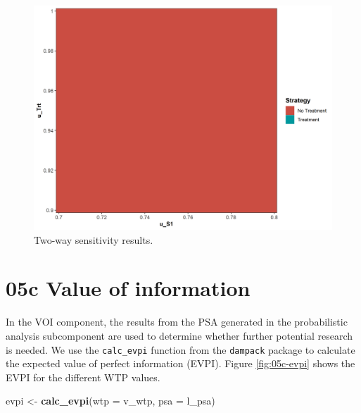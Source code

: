 \documentclass[]{book}
\newenvironment{Shaded}{\begin{snugshade}}{\end{snugshade}}
\newcommand{\KeywordTok}[1]{\textcolor[rgb]{0.13,0.29,0.53}{\textbf{#1}}}
\newcommand{\DataTypeTok}[1]{\textcolor[rgb]{0.13,0.29,0.53}{#1}}
\newcommand{\StringTok}[1]{\textcolor[rgb]{0.31,0.60,0.02}{#1}}
\newcommand{\NormalTok}[1]{#1}
\begin{document}
\begin{figure}

{\centering \includegraphics[width=1\linewidth]{../figs/05b_twsa_uS1_uTrt_nmb} 

}

\caption{Two-way sensitivity results.}\label{fig:05b-twsa-uS1-uTrt-nmb}
\end{figure}

\section{05c Value of information}\label{voi}

In the VOI component, the results from the PSA generated in the
probabilistic analysis subcomponent are used to determine whether
further potential research is needed. We use the \texttt{calc\_evpi}
function from the \texttt{dampack} package to calculate the expected
value of perfect information (EVPI). Figure \ref{fig:05c-evpi} shows the
EVPI for the different WTP values.

\begin{Shaded}
\begin{Highlighting}[]
\NormalTok{evpi <-}\StringTok{ }\KeywordTok{calc_evpi}\NormalTok{(}\DataTypeTok{wtp =}\NormalTok{ v_wtp, }\DataTypeTok{psa =}\NormalTok{ l_psa)}
\end{Highlighting}
\end{Shaded}
\end{document}
